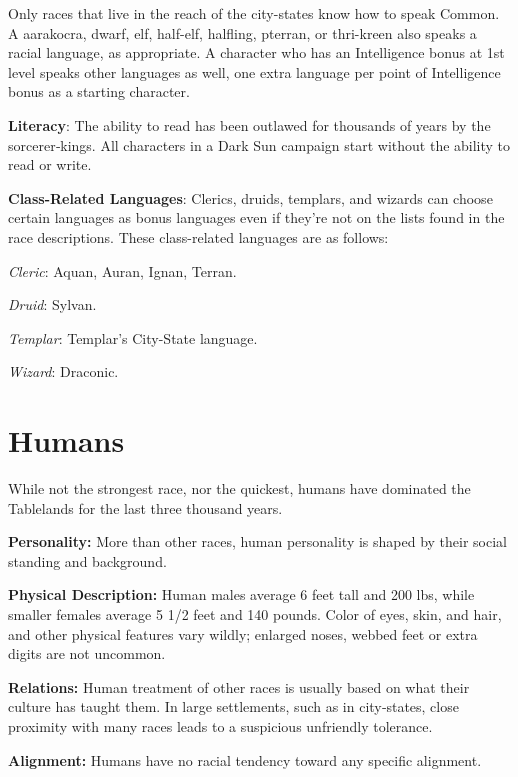 \documentclass[10pt,a4paper,twocolumn]{d20}
\begin{document}
Only races that live in the reach of the city-states know how to speak Common. A aarakocra, dwarf, elf, half-elf, halfling, pterran, or thri-kreen also speaks a racial language, as appropriate. A character who has an Intelligence bonus at 1st level speaks other languages as well, one extra language per point of Intelligence bonus as a starting character.

\textbf{Literacy}: The ability to read has been outlawed for thousands of years by the sorcerer‐kings. All characters in a Dark Sun campaign start without the ability to read or write.

\textbf{Class-Related Languages}: Clerics, druids, templars, and wizards can choose certain languages as bonus languages even if they’re not on the lists found in the race descriptions. These class-related languages are as follows:

\textit{Cleric}: Aquan, Auran, Ignan, Terran.

\textit{Druid}: Sylvan.

\textit{Templar}: Templar’s City-State language.

\textit{Wizard}: Draconic.

\section{Humans}

While not the strongest race, nor the quickest, humans have dominated the Tablelands for the last three thousand years.

\textbf{Personality:} More than other races, human personality is shaped by their social standing and background.

\textbf{Physical Description:} Human males average 6 feet tall and 200 lbs, while smaller females average 5 1/2 feet and 140 pounds. Color of eyes, skin, and hair, and other physical features vary wildly; enlarged noses, webbed feet or extra digits are not uncommon.

\textbf{Relations:} Human treatment of other races is usually based on what their culture has taught them. In large settlements, such as in city‐states, close proximity with many races leads to a suspicious unfriendly tolerance.

\textbf{Alignment:} Humans have no racial tendency toward any specific alignment.
\end{document}

